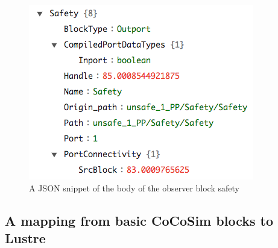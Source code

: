 \documentclass{article}
\begin{document}
\begin{figure}[h]
\begin{center}
    \includegraphics[scale=0.4]{figures/safety6}       
    
\end{center}  
  \caption{A JSON snippet of the body of the observer block safety}
  \label{jsonsafetybody}
\end{figure}

\subsection{A mapping from basic CoCoSim blocks to Lustre}
\end{document}
